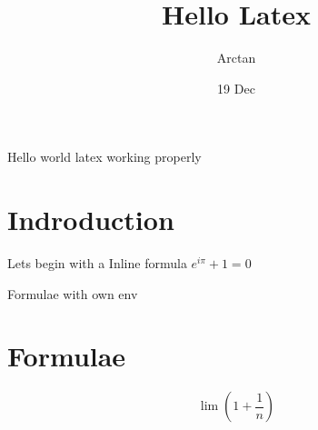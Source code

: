 \documentclass{article}
\title{Hello Latex}
\author{Arctan}
\date{19 Dec}
\begin{document}
    \maketitle
    Hello world  latex working properly
    \section{Indroduction}

    Lets begin with a Inline formula $e^{i\pi} + 1 =0$

    Formulae with own env
    \section{Formulae}
    $$ \lim \left(1+\frac{1}{n}\right) $$
\end{document}
